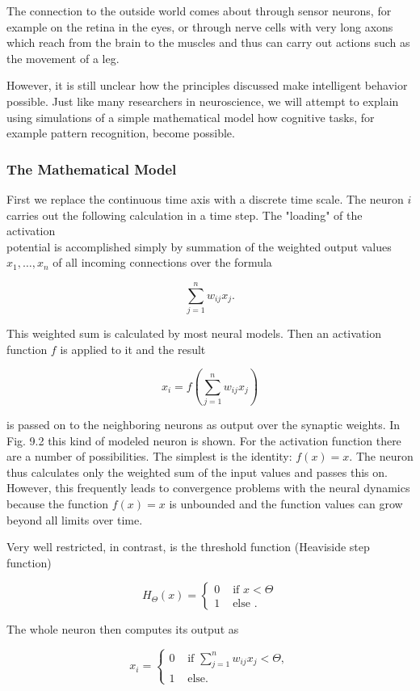 \documentclass[10pt]{article}
\begin{document}
The connection to the outside world comes about through sensor neurons, for example on the retina in the eyes, or through nerve cells with very long axons which reach from the brain to the muscles and thus can carry out actions such as the movement of a leg.

However, it is still unclear how the principles discussed make intelligent behavior possible. Just like many researchers in neuroscience, we will attempt to explain using simulations of a simple mathematical model how cognitive tasks, for example pattern recognition, become possible.

\subsubsection*{The Mathematical Model}
First we replace the continuous time axis with a discrete time scale. The neuron $i$ carries out the following calculation in a time step. The "loading" of the activation\\
potential is accomplished simply by summation of the weighted output values $x_{1}, \ldots, x_{n}$ of all incoming connections over the formula

$$
\sum_{j=1}^{n} w_{i j} x_{j} .
$$

This weighted sum is calculated by most neural models. Then an activation function $f$ is applied to it and the result

$$
x_{i}=f\left(\sum_{j=1}^{n} w_{i j} x_{j}\right)
$$

is passed on to the neighboring neurons as output over the synaptic weights. In Fig. 9.2 this kind of modeled neuron is shown. For the activation function there are a number of possibilities. The simplest is the identity: $f(x)=x$. The neuron thus calculates only the weighted sum of the input values and passes this on. However, this frequently leads to convergence problems with the neural dynamics because the function $f(x)=x$ is unbounded and the function values can grow beyond all limits over time.

Very well restricted, in contrast, is the threshold function (Heaviside step function)

$$
H_{\Theta}(x)= \begin{cases}0 & \text { if } x<\Theta \\ 1 & \text { else } .\end{cases}
$$

The whole neuron then computes its output as

$$
x_{i}= \begin{cases}0 & \text { if } \sum_{j=1}^{n} w_{i j} x_{j}<\Theta, \\ 1 & \text { else. }\end{cases}
$$
\end{document}
